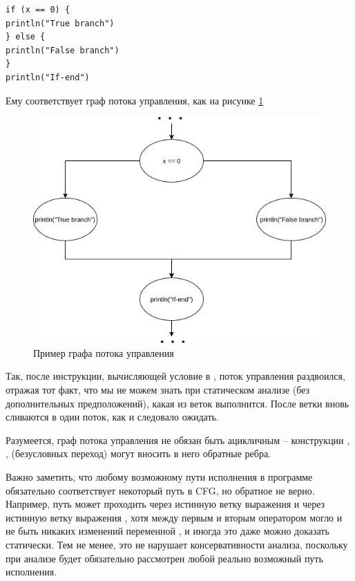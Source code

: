 \begin{verbatim}
if (x == 0) {
println("True branch")
} else {
println("False branch")
}
println("If-end")    
\end{verbatim}

Ему соответствует граф потока управления, как на рисунке \ref{control-flow-example}

\begin{figure}
	\centering
	\includegraphics[scale=0.5]{img/control-flow-example}
	\caption{Пример графа потока управления}
	\label{control-flow-example}
\end{figure}


Так, после инструкции, вычисляющей условие в , поток управления раздвоился, отражая тот факт, что мы не можем знать при статическом анализе (без дополнительных предположений), какая из веток выполнится. После ветки вновь сливаются в один поток, как и следовало ожидать.

Разумеется, граф потока управления не обязан быть ацикличным -- конструкции , ,  (безусловных переход) могут вносить в него обратные ребра.

Важно заметить, что любому возможному пути исполнения в программе обязательно соответствует некоторый путь в CFG, но обратное не верно. Например, путь может проходить через истинную ветку выражения \linebreak {} и через истинную ветку выражения , хотя между первым и вторым оператором могло и не быть никаких изменений переменной , и иногда это даже можно доказать статически.
Тем не менее, это не нарушает консервативности анализа, поскольку при анализе будет обязательно рассмотрен любой реально возможный путь исполнения. 

